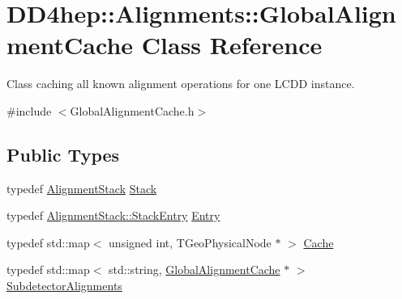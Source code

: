 \hypertarget{class_d_d4hep_1_1_alignments_1_1_global_alignment_cache}{
\section{DD4hep::Alignments::GlobalAlignmentCache Class Reference}
\label{class_d_d4hep_1_1_alignments_1_1_global_alignment_cache}
}


Class caching all known alignment operations for one LCDD instance.  


{\ttfamily \#include $<$GlobalAlignmentCache.h$>$}\subsection*{Public Types}
\begin{DoxyCompactItemize}
\item 
typedef \hyperlink{class_d_d4hep_1_1_alignments_1_1_alignment_stack}{AlignmentStack} \hyperlink{class_d_d4hep_1_1_alignments_1_1_global_alignment_cache_a789078b02081705b1f31774ae040523e}{Stack}
\item 
typedef \hyperlink{struct_d_d4hep_1_1_alignments_1_1_alignment_stack_1_1_stack_entry}{AlignmentStack::StackEntry} \hyperlink{class_d_d4hep_1_1_alignments_1_1_global_alignment_cache_a57c878d71fabf28ccab5c04f45f48fb1}{Entry}
\item 
typedef std::map$<$ unsigned int, TGeoPhysicalNode $\ast$ $>$ \hyperlink{class_d_d4hep_1_1_alignments_1_1_global_alignment_cache_a51cc6e8b7d9d85cfc296e8db7f360604}{Cache}
\item 
typedef std::map$<$ std::string, \hyperlink{class_d_d4hep_1_1_alignments_1_1_global_alignment_cache}{GlobalAlignmentCache} $\ast$ $>$ \hyperlink{class_d_d4hep_1_1_alignments_1_1_global_alignment_cache_abedb85cf969b8fb161695f5eca9717bc}{SubdetectorAlignments}
\end{DoxyCompactItemize}
